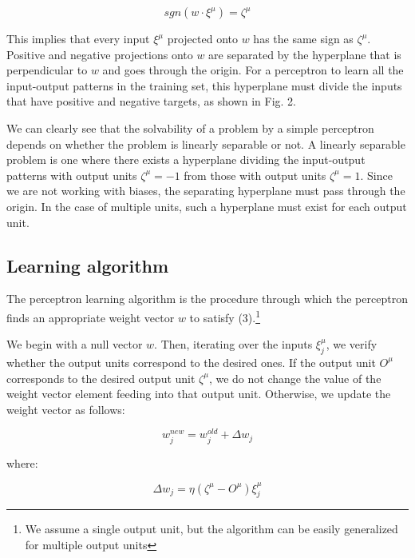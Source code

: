\begin{equation}
    sgn(w \cdot \xi^\mu) = \zeta^\mu
\end{equation}

This implies that every input $\xi^\mu$ projected onto $w$ has the same sign as $\zeta^\mu$. Positive and negative projections onto $w$ are separated by the hyperplane that is perpendicular to $w$ and goes through the origin. For a perceptron to learn all the input-output patterns in the training set, this hyperplane must divide the inputs that have positive and negative targets, as shown in Fig. 2.



We can clearly see that the solvability of a problem by a simple perceptron depends on whether the problem is linearly separable or not. A linearly separable problem is one where there exists a hyperplane dividing the input-output patterns with output units $\zeta^\mu = -1$ from those with output units $\zeta^\mu = 1$. Since we are not working with biases, the separating hyperplane must pass through the origin. In the case of multiple units, such a hyperplane must exist for each output unit.



\subsection{Learning algorithm}

The perceptron learning algorithm is the procedure through which the perceptron finds an appropriate weight vector $w$ to satisfy (3).\footnote[1]{We assume a single output unit, but the algorithm can be easily generalized for multiple output units}

We begin with a null vector $w$. Then, iterating over the inputs $\xi_j^\mu$, we verify whether the output units correspond to the desired ones. If the output unit $O^\mu$ corresponds to the desired output unit $\zeta^\mu$, we do not change the value of the weight vector element feeding into that output unit. Otherwise, we update the weight vector as follows:

\begin{equation}
    w_{j}^{new} = w_{j}^{old} + \Delta w_{j}
\end{equation}

\noindent where:

\begin{equation}
    \Delta w_{j} = \eta (\zeta^{\mu} - O^{\mu}) \xi_j^{\mu}
\end{equation}

